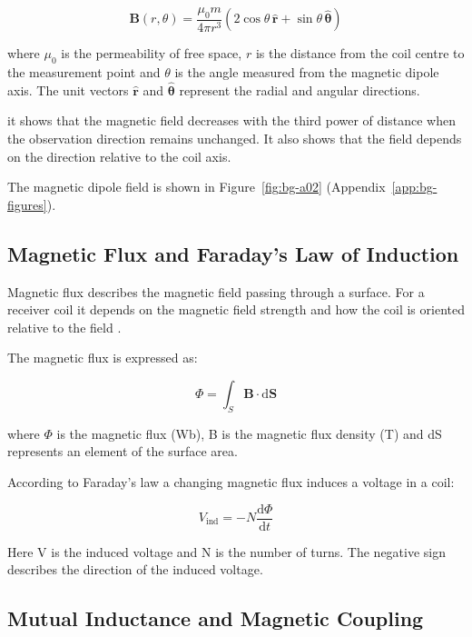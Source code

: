 \begin{equation}
    \mathbf{B}(r,\theta) =
    \frac{\mu_0 m}{4\pi r^3}
    \left(
        2\cos\theta\,\hat{\mathbf{r}}
        +
        \sin\theta\,\hat{\boldsymbol{\theta}}
    \right)
\end{equation}

where $\mu_0$ is the permeability of free space, $r$ is the distance from the coil centre to the
measurement point and $\theta$ is the angle measured from the magnetic dipole axis. The unit vectors
$\hat{\mathbf{r}}$ and $\hat{\boldsymbol{\theta}}$ represent the radial and angular directions.

it shows that the magnetic field decreases with the third power of distance when the observation
direction remains unchanged. It also shows that the field depends on the direction relative to the coil axis.

The magnetic dipole field is shown in
Figure~\ref{fig:bg-a02}
(Appendix~\ref{app:bg-figures}).





\subsection{Magnetic Flux and Faraday's Law of Induction}\label{sec:bg-1-2-3}

Magnetic flux describes the magnetic field passing through a surface. For a receiver coil it depends on the magnetic field strength and how the coil is oriented relative to the field \cite{sadiku2018elements}.

The magnetic flux is expressed as:

\[
\Phi = \int_S \mathbf{B} \cdot \mathrm{d}\mathbf{S}
\]

where \(\Phi\) is the magnetic flux (Wb), B is the magnetic flux density (T) and dS represents an element of the surface area.

According to Faraday's law a changing magnetic flux induces a voltage in a coil:

\[
V_{\mathrm{ind}} = -N\frac{\mathrm{d}\Phi}{\mathrm{d}t}
\]

Here V is the induced voltage and N is the number of turns. The negative sign describes the direction of the induced voltage.




\subsection{Mutual Inductance and Magnetic Coupling}\label{sec:bg-1-2-4}

